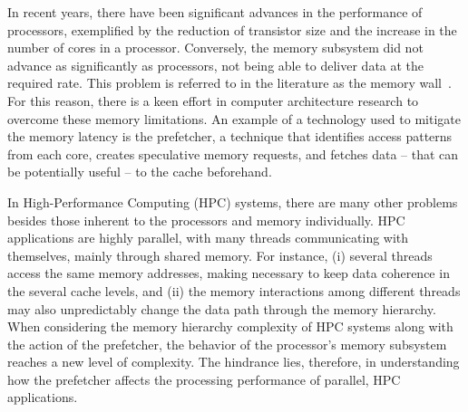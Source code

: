 \documentclass[AMA,final,STIX1COL]{WileyNJD-v2}
\newcommand{\fbm}[1]{\textcolor{red}{\bfseries \ul{fbm: #1} }\vspace{0.2cm}}
\begin{document}
In recent years, there have been significant advances in the performance of processors, exemplified by the reduction of transistor size and the increase in the number of cores in a processor. %
Conversely, the memory subsystem did not advance as significantly as processors, not being able to deliver data at the required rate. 
This problem is referred to in the literature as the memory wall~\cite{wulf1995memory}.
For this reason, there is a keen effort in computer architecture research to overcome these memory limitations. 
An example of a technology used to mitigate the memory latency is the prefetcher, a technique that identifies access patterns from each core, creates speculative memory requests, and fetches data -- that can be potentially useful -- to the cache beforehand.

In High-Performance Computing (HPC) systems, there are many other problems besides those inherent to the processors and memory individually. 
HPC applications are highly parallel, with many threads communicating with themselves, mainly through shared memory. For instance, (i) several threads access the same memory addresses, making necessary to keep data coherence in the several cache levels, and (ii) the memory interactions among different threads may also unpredictably change the data path through the memory hierarchy. 
When considering the memory hierarchy complexity of HPC systems along with the action of the prefetcher, the behavior of the processor's memory subsystem reaches a new level of complexity. 
The hindrance lies, therefore, in understanding how the prefetcher affects the processing performance of parallel, HPC applications.
\end{document}
